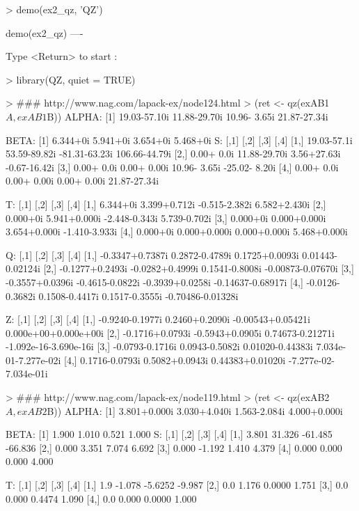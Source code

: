 \begin{Code}[title=QZ demo ex2\_qz]
> demo(ex2_qz, 'QZ')


	demo(ex2_qz)
	---- ~~~~~~

Type  <Return>	 to start : 

> library(QZ, quiet = TRUE)

> ### http://www.nag.com/lapack-ex/node124.html
> (ret <- qz(exAB1$A, exAB1$B))
ALPHA:
[1] 19.03-57.10i 11.88-29.70i 10.96- 3.65i 21.87-27.34i

BETA:
[1] 6.344+0i 5.941+0i 3.654+0i 5.468+0i
S:
            [,1]         [,2]          [,3]          [,4]
[1,] 19.03-57.1i 53.59-89.82i -81.31-63.23i 106.66-44.79i
[2,]  0.00+ 0.0i 11.88-29.70i   3.56+27.63i  -0.67-16.42i
[3,]  0.00+ 0.0i  0.00+ 0.00i  10.96- 3.65i -25.02- 8.20i
[4,]  0.00+ 0.0i  0.00+ 0.00i   0.00+ 0.00i  21.87-27.34i

T:
         [,1]         [,2]          [,3]          [,4]
[1,] 6.344+0i 3.399+0.712i -0.515-2.382i  6.582+2.430i
[2,] 0.000+0i 5.941+0.000i -2.448-0.343i  5.739-0.702i
[3,] 0.000+0i 0.000+0.000i  3.654+0.000i -1.410-3.933i
[4,] 0.000+0i 0.000+0.000i  0.000+0.000i  5.468+0.000i

Q:
                [,1]            [,2]            [,3]              [,4]
[1,] -0.3347+0.7387i  0.2872-0.4789i  0.1725+0.0093i  0.01443-0.02124i
[2,] -0.1277+0.2493i -0.0282+0.4999i  0.1541-0.8008i -0.00873-0.07670i
[3,] -0.3557+0.0396i -0.4615-0.0822i -0.3939+0.0258i -0.14637-0.68917i
[4,] -0.0126-0.3682i  0.1508-0.4417i  0.1517-0.3555i -0.70486-0.01328i

Z:
                [,1]            [,2]              [,3]                  [,4]
[1,] -0.9240-0.1977i  0.2460+0.2090i -0.00543+0.05421i  0.000e+00+0.000e+00i
[2,] -0.1716+0.0793i -0.5943+0.0905i  0.74673-0.21271i -1.092e-16-3.690e-16i
[3,] -0.0793-0.1716i  0.0943-0.5082i  0.01020-0.44383i  7.034e-01-7.277e-02i
[4,]  0.1716-0.0793i  0.5082+0.0943i  0.44383+0.01020i -7.277e-02-7.034e-01i

> ### http://www.nag.com/lapack-ex/node119.html
> (ret <- qz(exAB2$A, exAB2$B))
ALPHA:
[1] 3.801+0.000i 3.030+4.040i 1.563-2.084i 4.000+0.000i

BETA:
[1] 1.900 1.010 0.521 1.000
S:
      [,1]   [,2]    [,3]    [,4]
[1,] 3.801 31.326 -61.485 -66.836
[2,] 0.000  3.351   7.074   6.692
[3,] 0.000 -1.192   1.410   4.379
[4,] 0.000  0.000   0.000   4.000

T:
     [,1]   [,2]    [,3]   [,4]
[1,]  1.9 -1.078 -5.6252 -9.987
[2,]  0.0  1.176  0.0000  1.751
[3,]  0.0  0.000  0.4474  1.090
[4,]  0.0  0.000  0.0000  1.000


\end{Code}
